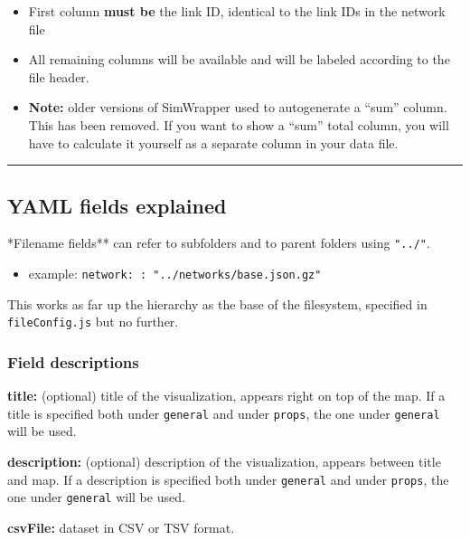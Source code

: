 \begin{itemize}
\tightlist
\item
  First column \textbf{must be} the link ID, identical to the link IDs
  in the network file
\item
  All remaining columns will be available and will be labeled according
  to the file header.
\item
  \textbf{Note:} older versions of SimWrapper used to autogenerate a
  ``sum'' column. This has been removed. If you want to show a ``sum''
  total column, you will have to calculate it yourself as a separate
  column in your data file.
\end{itemize}

\begin{center}\rule{0.5\linewidth}{0.5pt}\end{center}

\hypertarget{yaml-fields-explained}{%
\subsection{YAML fields explained}}

*Filename fields** can refer to subfolders and to parent folders using
\texttt{"../"}.

\begin{itemize}
\tightlist
\item
  example: \texttt{network:\ :\ "../networks/base.json.gz"}
\end{itemize}

This works as far up the hierarchy as the base of the filesystem,
specified in \texttt{fileConfig.js} but no further.

\hypertarget{field-descriptions}{%
\subsubsection{Field descriptions}\label{field-descriptions}}

\textbf{title:} (optional) title of the visualization, appears right on
top of the map. If a title is specified both under \texttt{general} and
under \texttt{props}, the one under \texttt{general} will be used.

\textbf{description:} (optional) description of the visualization,
appears between title and map. If a description is specified both under
\texttt{general} and under \texttt{props}, the one under
\texttt{general} will be used.

\textbf{csvFile:} dataset in CSV or TSV format.

